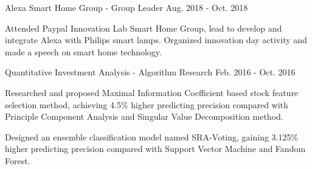 \documentclass[11pt, a4paper, UTF8]{awesome-cv}
\begin{document}
%
\begin{cventries}
  \cventry
    {Alexa Smart Home Group - Group Leader} %
    {} %
    {} %
    {Aug. 2018 - Oct. 2018} %
    {
      \begin{cvitems} %
        \item {Attended Paypal Innovation Lab Smart Home Group, lead to develop and integrate Alexa with Philips smart lamps. Organized innovation day activity and made a speech on smart home technology.}
      \end{cvitems}
    }

  \cventry
    {Quantitative Investment Analysis  - Algorithm Research} %
    {} %
    {} %
    {Feb. 2016 - Oct. 2016} %
    {
      \begin{cvitems} %
        \item {Researched and proposed Maximal Information Coefficient based stock feature selection method, achieving 4.5\% higher predicting precision compared with Principle Component Analysis and Singular Value Decomposition method.}
        \item {Designed an ensemble classification model named SRA-Voting, gaining 3.125\% higher predicting precision compared with Support Vector Machine and Fandom Forest.}
      \end{cvitems}
    }
    

\end{cventries}
\end{document}
